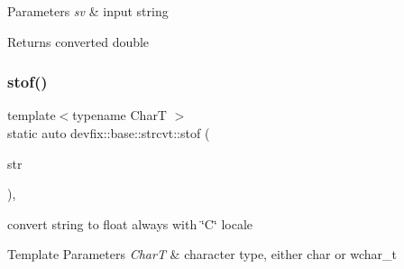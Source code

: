 \begin{DoxyParams}{Parameters}
{\em sv} & input string \\
\hline
\end{DoxyParams}
\begin{DoxyReturn}{Returns}
converted double 
\end{DoxyReturn}
\mbox{\label{structdevfix_1_1base_1_1strcvt_a5b28d529cfbbf026c8e1550e92e2e557}} 
\subsubsection{\texorpdfstring{stof()}{stof()}\hspace{0.1cm}{\footnotesize\ttfamily [1/2]}}
{\footnotesize\ttfamily template$<$typename CharT $>$ \\
static auto devfix\+::base\+::strcvt\+::stof (\begin{DoxyParamCaption}\item[{const std\+::basic\+\_\+string$<$ CharT $>$ \&}]{str }\end{DoxyParamCaption})\hspace{0.3cm}{\ttfamily [inline]}, {\ttfamily [static]}}



convert string to float always with \char`\"{}\+C\char`\"{} locale 


\begin{DoxyTemplParams}{Template Parameters}
{\em CharT} & character type, either \textquotesingle{}char\textquotesingle{} or \textquotesingle{}wchar\+\_\+t\textquotesingle{} \\
\hline
\end{DoxyTemplParams}

